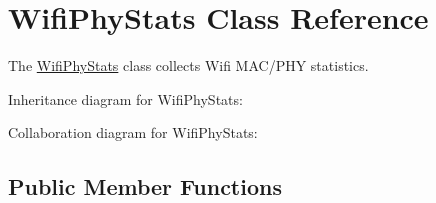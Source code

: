 \hypertarget{classWifiPhyStats}{}\section{Wifi\+Phy\+Stats Class Reference}
\label{classWifiPhyStats}


The \hyperlink{classWifiPhyStats}{Wifi\+Phy\+Stats} class collects Wifi M\+A\+C/\+P\+HY statistics.  




Inheritance diagram for Wifi\+Phy\+Stats\+:


Collaboration diagram for Wifi\+Phy\+Stats\+:
\subsection*{Public Member Functions}
